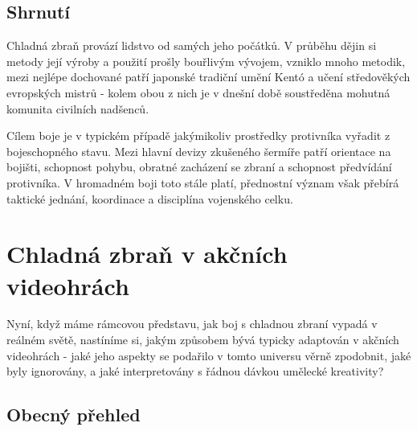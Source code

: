 \subsection{Shrnutí}
Chladná zbraň provází lidstvo od samých jeho počátků. V průběhu dějin si metody její výroby a použití prošly bouřlivým vývojem, vzniklo mnoho metodik, mezi nejlépe dochované patří japonské tradiční umění Kentó a učení středověkých evropských mistrů - kolem obou z nich je v dnešní době soustředěna mohutná komunita civilních nadšenců.

Cílem boje je v typickém případě jakýmikoliv prostředky protivníka vyřadit z bojeschopného stavu. Mezi hlavní devizy zkušeného šermíře patří orientace na bojišti, schopnost pohybu, obratné zacházení se zbraní a schopnost předvídání protivníka. V hromadném boji toto stále platí, přednostní význam však přebírá taktické jednání, koordinace a disciplína vojenského celku.

\clearpage


\section{Chladná zbraň v akčních videohrách}

Nyní, když máme rámcovou představu, jak boj s chladnou zbraní vypadá v reálném světě, nastíníme si, jakým způsobem bývá typicky adaptován v akčních videohrách - jaké jeho aspekty se podařilo v tomto universu věrně zpodobnit, jaké byly ignorovány, a jaké interpretovány s řádnou dávkou umělecké kreativity?

\subsection{Obecný přehled} \label{weaponInVideogamesBasics}

